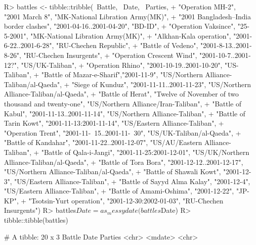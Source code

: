 \documentclass[
]{jss}
\begin{document}
\begin{CodeChunk}
\begin{CodeInput}
R> battles <- tibble::tribble(~Battle, ~Date, ~Parties,
+                            "Operation MH-2", "2001 March 8", "MK-National Libration Army(MK)",
+                            "2001 Bangladesh–India border clashes", "2001-04-16..2001-04-20", "BD-ID",
+                            "Operation Vaksince", "25-5-2001", "MK-National Libration Army(MK)",
+                            "Alkhan-Kala operation", "2001-6-22..2001-6-28", "RU-Chechen Republic",
+                            "Battle of Vedeno", "2001-8-13..2001-8-26", "RU-Chechen Insurgents", 
+                            "Operation Crescent Wind", "2001-10-7..2001-12?", "US/UK-Taliban",
+                            "Operation Rhino", "2001-10-19..2001-10-20", "US-Taliban",
+                            "Battle of Mazar-e-Sharif","2001-11-9", "US/Northern Alliance-Taliban/al-Qaeda", 
+                            "Siege of Kunduz", "2001-11-11..2001-11-23", "US/Northern Alliance-Taliban/al-Qaeda",
+                            "Battle of Herat", "Twelve of November of two thousand and twenty-one", "US/Northern Alliance/Iran-Taliban", 
+                            "Battle of Kabul", "2001-11-13..2001-11-14", "US/Northern Alliance-Taliban",
+                            "Battle of Tarin Kowt", "2001-11-13:2001-11-14", "US/Eastern Alliance-Taliban",
+                            "Operation Trent", "2001-11-~15..2001-11-~30", "US/UK-Taliban/al-Qaeda",
+                            "Battle of Kandahar", "2001-11-22..2001-12-07", "US/AU/Eastern Alliance-Taliban",
+                            "Battle of Qala-i-Jangi", "2001-11-25:2001-12-01", "US/UK/Northern Alliance-Taliban/al-Qaeda",
+                            "Battle of Tora Bora", "2001-12-12..2001-12-17", "US/Northern Alliance-Taliban/al-Qaeda",
+                            "Battle of Shawali Kowt", "2001-12-3", "US/Eastern Alliance-Taliban",
+                            "Battle of Sayyd Alma Kalay", "2001-12-4", "US/Eastern Alliance-Taliban",
+                            "Battle of Amami-Oshima", "2001-12-22", "JP-KP",
+                            "Tsotsin-Yurt operation", "2001-12-30:2002-01-03", "RU-Chechen Insurgents")
R> battles$Date = as_messydate(battles$Date)
R> tibble::tibble(battles)
\end{CodeInput}
\begin{CodeOutput}
# A tibble: 20 x 3
   Battle                               Date                     Parties        
   <chr>                                <mdate>                  <chr>          

\end{CodeOutput}
\end{CodeChunk}
\end{document}
